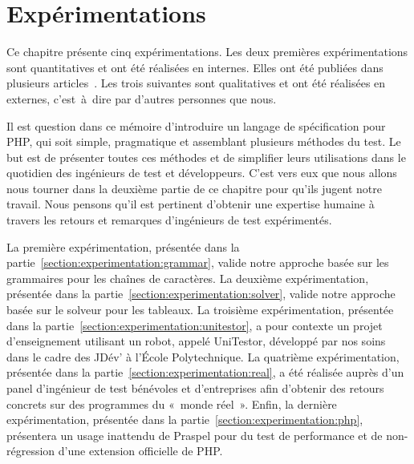 \chapter{Expérimentations}
\label{chapter:experimentations}

\minitoc

Ce chapitre présente cinq expérimentations. Les deux premières expérimentations
sont {\strong quantitatives} et ont été réalisées en internes. Elles ont été
publiées dans plusieurs articles~. Les trois suivantes sont {\strong qualitatives} et ont été
réalisées en externes, c'est~à~dire par d'autres personnes que nous.

Il est question dans ce mémoire d'introduire un langage de spécification pour
PHP, qui soit simple, pragmatique et assemblant plusieurs méthodes du test. Le
but est de présenter toutes ces méthodes et de simplifier leurs utilisations
dans le quotidien des ingénieurs de test et développeurs. C'est vers eux que
nous allons nous tourner dans la deuxième partie de ce chapitre pour qu'ils
jugent notre travail. Nous pensons qu'il est pertinent d'obtenir une expertise
humaine à travers les retours et remarques d'ingénieurs de test expérimentés.

La première expérimentation, présentée dans la
partie~\ref{section:experimentation:grammar}, valide notre approche basée sur
les grammaires pour les chaînes de caractères. La deuxième expérimentation,
présentée dans la partie~\ref{section:experimentation:solver}, valide notre
approche basée sur le solveur pour les tableaux. La troisième expérimentation,
présentée dans la partie~\ref{section:experimentation:unitestor}, a pour
contexte un projet d'enseignement utilisant un robot, appelé UniTestor,
développé par nos soins dans le cadre des JDév' à l'École Polytechnique. La
quatrième expérimentation, présentée dans la
partie~\ref{section:experimentation:real}, a été réalisée auprès d'un panel
d'ingénieur de test bénévoles et d'entreprises afin d'obtenir des retours
concrets sur des programmes du «~monde réel~». Enfin, la dernière
expérimentation, présentée dans la partie~\ref{section:experimentation:php},
présentera un usage inattendu de Praspel pour du test de performance et de
non-régression d'une extension officielle de PHP.

